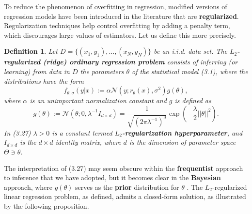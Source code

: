 \documentclass{report}
\newtheorem{definition}{Definition}[chapter]
\begin{document}
To reduce the phenomenon of overfitting in regression, modified versions of regression models have been introduced in the literature that are \textbf{regularized}. Regularization techniques help control overfitting by adding a penalty term, which discourages large values of estimators. Let us define this more precisely.

\begin{definition}
Let $D = \{(x_1,y_1),\dots,(x_N,y_N)\}$ be an i.i.d. data set. The \textbf{$L_2$-regularized (ridge) ordinary regression problem} consists of inferring (or learning) from data in $D$ the parameters $\theta$ of the statistical model (3.1), where the distributions have the form
\begin{equation}
f_{\theta,\sigma}(y|x) := \alpha\mathcal{N}(y;r_\theta(x),\sigma^2)g(\theta),
\end{equation}
where $\alpha$ is an unimportant normalization constant and $g$ is defined as
\begin{equation}
g(\theta) := \mathcal{N}(\theta;0,\lambda^{-1}I_{d\times d}) = \frac{1}{\sqrt{(2\pi\lambda^{-1})^d}}\exp\left(-\frac{\lambda}{2}||\theta||^2\right).
\end{equation}
In (3.27) $\lambda > 0$ is a constant termed \textbf{$L_2$-regularization hyperparameter}, and $I_{d\times d}$ is the $d\times d$ identity matrix, where $d$ is the  dimension of parameter space $\Theta \ni \theta$.
\end{definition}

The interpretation of (3.27) may seem obscure within the \textbf{frequentist} approach to inference that we have adopted, but it becomes clear in the \textbf{Bayesian} approach, where $g(\theta)$ serves as the \textbf{prior} distribution for $\theta$ . The $L_2$-regularized linear regression problem, as defined, admits a closed-form solution, as illustrated by the following proposition.
\end{document}
